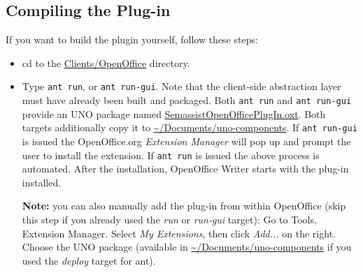 \subsection{Compiling the Plug-in}
If you want to build the plugin yourself, follow these steps:
\begin{itemize}
  \item cd to the \url{Clients/OpenOffice} directory.

  \item Type \texttt{ant run}, or \texttt{ant run-gui}. Note that the
    client-side abstraction layer must have already been built and
    packaged. Both \texttt{ant run} and \texttt{ant run-gui} provide
    an UNO package named \url{SemassistOpenOfficePlugIn.oxt}. Both
    targets additionally copy it to \url{~/Documents/uno-components}.
    If \texttt{ant run-gui} is issued the OpenOffice.org
    \emph{Extension Manager} will pop up and prompt the user to
    install the extension.  If \texttt{ant run} is issued the above
    process is automated.  After the installation, OpenOffice Writer
    starts with the plug-in installed.

    \textbf{Note:} you can also manually add the plug-in from within
    OpenOffice (skip this step if you already used the \emph{run} or
    \emph{run-gui} target): Go to Tools, Extension Manager. Select
    \emph{My Extensions}, then click \emph{Add...} on the
    right. Choose the UNO package (available in
    \url{~/Documents/uno-components} if you used the \emph{deploy}
    target for ant).
\end{itemize}

